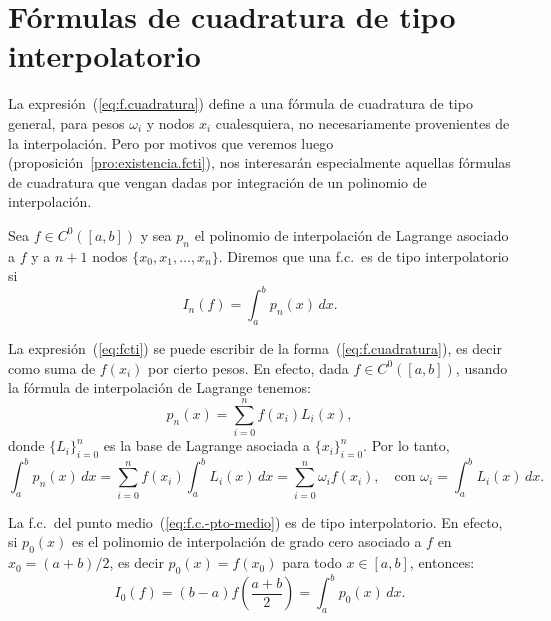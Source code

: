 \section{Fórmulas de cuadratura de tipo interpolatorio}
\label{sec:cuadratura-interpolatorio}

La expresión~(\ref{eq:f.cuadratura}) define a una fórmula de
cuadratura de tipo general, para pesos $\omega_i$ y nodos $x_i$
cualesquiera, no necesariamente provenientes de la interpolación.
Pero por motivos que veremos luego
(proposición~\ref{pro:existencia.fcti}), nos interesarán especialmente
aquellas fórmulas de cuadratura que vengan dadas por integración de un
polinomio de interpolación.
\begin{definition}
  Sea $f\in C^0([a,b])$ y sea $p_n$ el polinomio de interpolación de
  Lagrange asociado a $f$ y a $n+1$ nodos
  $\{x_0,x_1,\dots,x_n\}$. Diremos que una f.c.\ es de tipo
  interpolatorio si
  \begin{equation}
    \label{eq:fcti}
    I_n(f)=\int_a^b p_n(x)\, dx.
  \end{equation}
  \label{def:fcti}
\end{definition}

La expresión~(\ref{eq:fcti}) se puede escribir de la
forma~(\ref{eq:f.cuadratura}), es decir como suma de $f(x_i)$ por
cierto pesos. En efecto, dada $f\in C^0([a,b])$,
usando la fórmula de interpolación de Lagrange tenemos:
\begin{equation*}
  p_n(x)=\sum_{i=0}^n f(x_i) L_i(x),
\end{equation*}
donde $\{L_i\}_{i=0}^n$ es la base de Lagrange asociada a
$\{x_i\}_{i=0}^n$. Por lo tanto,
\begin{equation*}
  \int_a^bp_n(x)\,dx = \sum_{i=0}^n f(x_i) \int_a^b L_i(x)\,dx
  =\sum_{i=0}^n \omega_i f(x_i), \quad \text{con } \omega_i=\int_a^b L_i(x)\,dx.
\end{equation*}

\begin{example}
  \label{ex:formula-pto-medio-interpol}
  La f.c.\ del punto medio~(\ref{eq:f.c.-pto-medio}) es de tipo
  interpolatorio. En efecto, si $p_0(x)$ es el polinomio de
  interpolación de grado cero asociado a $f$ en $x_0=(a+b)/2$, es
  decir $p_0(x)=f(x_0)$ para todo $x\in[a,b]$, entonces:
  \begin{equation*}
    I_0(f) = (b-a)f\left(\frac{a+b}{2}\right) = \int_a^b p_0(x)\,dx.
  \end{equation*}
\end{example}

